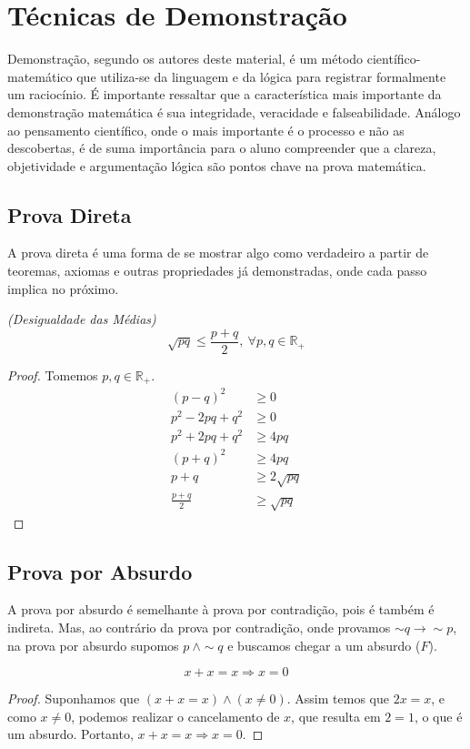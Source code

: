 \chapter{Técnicas de Demonstração}
Demonstração, segundo os autores deste material, é um método científico-matemático que utiliza-se da linguagem e da lógica para registrar formalmente um raciocínio. É importante ressaltar que a característica mais importante da demonstração matemática é sua integridade, veracidade e falseabilidade. Análogo ao pensamento científico, onde o mais importante é o processo e não as descobertas, é de suma importância para o aluno compreender que a clareza, objetividade e argumentação lógica são pontos chave na prova matemática.

\section{Prova Direta}
A prova direta é uma forma de se mostrar algo como verdadeiro a partir de teoremas, axiomas e outras propriedades já demonstradas, onde cada passo implica no próximo.\par 
\begin{exemplo} \emph{(Desigualdade das Médias)}
\[\sqrt{pq} \le \frac{p+q}{2},\ \forall p,q \in \mathbb{R}_{+}\]
\begin{proof}
Tomemos $p, q \in \mathbb{R}_{+}$.
\begin{align*}
{\left(p-q \right)}^2 &\ge 0 \\
p^2 - 2pq + q^2 &\ge 0 \\
p^2 + 2pq + q^2 &\ge 4pq \\
{\left(p+q \right)}^2 &\ge 4pq\\
p+q &\ge 2 \sqrt{pq}\\
\frac{p+q}{2} &\ge \sqrt{pq}
\end{align*}
\end{proof}
\end{exemplo}

\section{Prova por Absurdo}
A prova por absurdo é semelhante à prova por contradição, pois é também é indireta. Mas, ao contrário da prova por contradição, onde provamos $\sim \! q \rightarrow \sim \! p$, na prova por absurdo supomos $p \: \wedge \sim \! q$ e buscamos chegar a um absurdo ($F$).
\begin{exemplo}
\[ x+x=x \Rightarrow x=0\]
\begin{proof}
Suponhamos que $(x+x=x) \wedge (x \neq 0)$. Assim temos que $2x=x$, e como $x \neq 0$, podemos realizar o cancelamento de $x$, que resulta em $2=1$, o que é um absurdo. Portanto, $x+x=x \Rightarrow x=0$.
\end{proof}
\end{exemplo}

